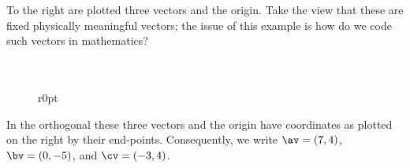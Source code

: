 \begin{example} 
To the right are plotted three vectors and the origin.
Take the view that these are fixed physically meaningful vectors; the issue of this example is how do we code such vectors in mathematics?
\\\ \\\ 

\begin{figure}r{0pt}
\end{figure}
In the orthogonal  these three vectors and the origin have coordinates as plotted on the right by their end-points.
Consequently, we write \(\av=(7,4)\), \(\bv=(0,-5)\), and \(\cv=(-3,4)\).
\\\ \\\ \\\ \\\


\end{example}
